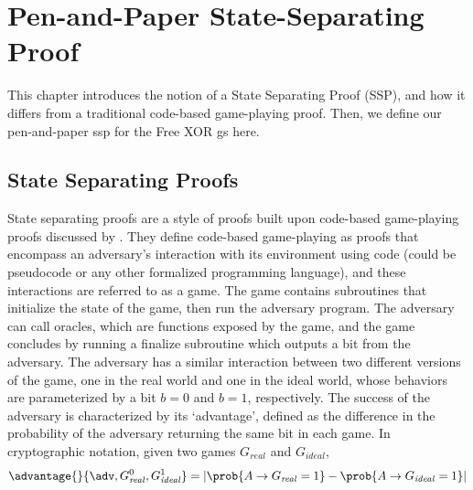 \theoremstyle{atheorem}
\newtheorem{claim}[theorem]{Claim}

\chapter{Pen-and-Paper State-Separating Proof}
\label{chp:penpaperssp}
\newcommand{\codeequiv}{\overset{\textit{code}}{\equiv}}
This chapter introduces the notion of a State Separating Proof (SSP), and how it differs from a traditional code-based game-playing proof. Then, we define our pen-and-paper \acrlong{ssp} for the Free XOR \acrlong{gs} here.
\section{State Separating Proofs}
\label{sec:ssp}
State separating proofs are a style of proofs built upon code-based game-playing proofs discussed by \citeauthor{EC:BelRog06} \cite{EC:BelRog06}. They define code-based game-playing as proofs that encompass an adversary's interaction with its environment using code (could be pseudocode or any other formalized programming language), and these interactions are referred to as a game. The game contains subroutines that initialize the state of the game, then run the adversary program. The adversary can call oracles, which are functions exposed by the game, and the game concludes by running a finalize subroutine which outputs a bit from the adversary. The adversary has a similar interaction between two different versions of the game, one in the real world and one in the ideal world, whose behaviors are parameterized by a bit $b=0$ and $b=1$, respectively. 
The success of the adversary is characterized by its `advantage', defined as the difference in the probability of the adversary returning the same bit in each game. In cryptographic notation, given two games $G_\mathit{real}$ and $G_\mathit{ideal}$, 
\[ \advantage{}{\adv, G^0_\mathit{real}, G^1_\mathit{ideal}} = \lvert \prob{A\to G_\mathit{real}=1} - \prob{A\to G_\mathit{ideal}=1} \rvert\]

